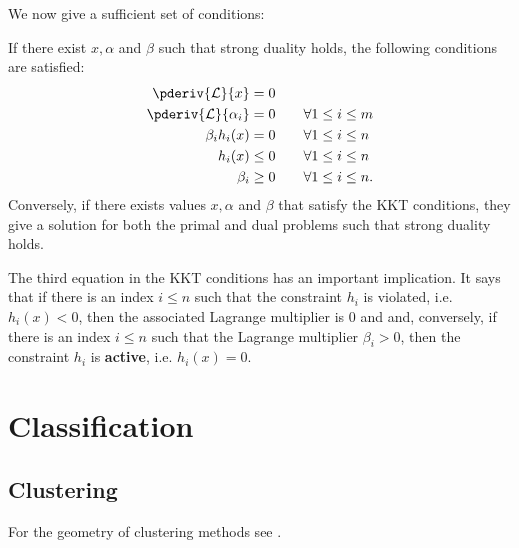 {    We now give a sufficient set of conditions:
    \begin{property}
        If there exist $x,\alpha$ and $\beta$ such that strong duality holds, the following conditions are satisfied:
        \begin{align}
            \pderiv{\mathcal{L}}{x} &= 0\\
            \pderiv{\mathcal{L}}{\alpha_i} &= 0\qquad\forall1\leq i\leq m\\
            \beta_ih_i(x) &= 0\qquad\forall1\leq i\leq n\\
            h_i(x)&\leq0\qquad\forall1\leq i\leq n\\
            \beta_i&\geq0\qquad\forall1\leq i\leq n.
        \end{align}
        Conversely, if there exists values $x,\alpha$ and $\beta$ that satisfy the KKT conditions, they give a solution for both the primal and dual problems such that strong duality holds.
    \end{property}
    \begin{remark}
        The third equation in the KKT conditions has an important implication. It says that if there is an index $i\leq n$ such that the constraint $h_i$ is violated, i.e. $h_i(x)<0$, then the associated Lagrange multiplier is 0 and and, conversely, if there is an index $i\leq n$ such that the Lagrange multiplier $\beta_i>0$, then the constraint $h_i$ is \textbf{active}, i.e. $h_i(x)=0$.
    \end{remark}


\section{Classification}
\subsection{Clustering}

    For the geometry of clustering methods see \cite{clustering_bregman}.

}
